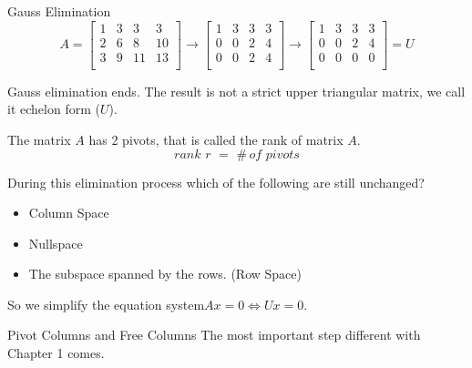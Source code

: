 \documentclass{beamer}
\begin{document}
\begin{frame}{Gauss Elimination}
\begin{equation*}
    A=\left[ \begin{matrix}
        1&		3&		3&		3\\
        2&		6&		8&		10\\
        3&		9&		11&		13\\
    \end{matrix} \right] \rightarrow \left[ \begin{matrix}
        1&		3&		3&		3\\
        0&		0&		2&		4\\
        0&		0&		2&		4\\
    \end{matrix} \right] \rightarrow \left[ \begin{matrix}
        1&		3&		3&		3\\
        0&		0&		2&		4\\
        0&		0&		0&		0\\
    \end{matrix} \right] =U
\end{equation*}

Gauss elimination ends. The result is not a strict upper triangular matrix, we call it echelon form ($U$).

\vspace{3pt}
The matrix $A$ has 2 pivots, that is called the \alert{rank} of matrix $A$.
\begin{equation*}
    rank\,\,r\,\,=\,\,\# \,of\,\,pivots
\end{equation*}

During this elimination process which of the following are still unchanged?

\begin{itemize}
    \item Column Space
    \item Nullspace
    \item The subspace spanned by the rows. (Row Space)
\end{itemize}

So we simplify the equation system$Ax=0\Leftrightarrow Ux=0$.
\end{frame}

\begin{frame}{Pivot Columns and Free Columns}
The most important step different with Chapter 1 comes.
\end{frame}
\end{document}
